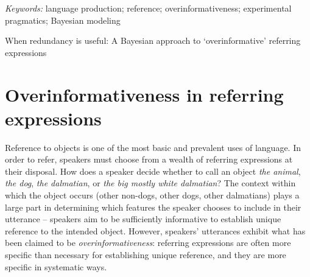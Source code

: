 \documentclass[11pt]{article}
\newcommand{\jd}[1]{\textcolor{Red}{[jd: #1]}}
\newcommand{\ndg}[1]{\textcolor{Green}{[ndg: #1]}}
\begin{document}
\emph{Keywords:} language production; reference; overinformativeness; experimental pragmatics; Bayesian modeling


\pagebreak




When redundancy is useful: A Bayesian approach to `overinformative' referring expressions


\section[]{Overinformativeness in referring expressions}
\label{sec:intro}

Reference to objects is one of the most basic and prevalent uses of language. In order to refer, speakers must choose from a wealth of referring expressions at their disposal. How does a speaker decide whether to call an object \emph{the animal}, \emph{the dog}, \emph{the dalmatian}, or \emph{the big mostly white dalmatian}? The context within which the object occurs (other non-dogs, other dogs, other dalmatians) plays a large part in determining which features the speaker chooses to include in their utterance -- speakers aim to be sufficiently informative to establish unique reference to the intended object. However, speakers' utterances exhibit what has been claimed to be \emph{overinformativeness}: referring expressions are often more specific than necessary for establishing unique reference, and they are more specific in systematic ways. 
\end{document}
